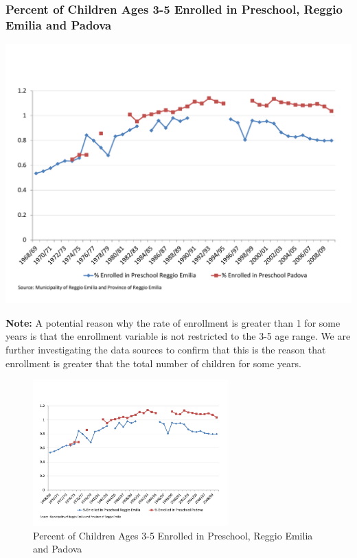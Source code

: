 \documentclass[static]{JJH-Beamer_PAGENOS}
\begin{document}
\begin{frame}
\frametitle{Percent of Children Ages 3-5 Enrolled in Preschool, Reggio Emilia and Padova}

\begin{center}
\includegraphics[scale=0.33]{../../output/image/Enrollement_Preschool_age3-5.pdf}
\end{center}
\tiny{\textbf{Note:} A potential reason why the rate of enrollment is greater than 1 for some years is that the enrollment variable is not restricted to the 3-5 age range. We are further investigating the data sources to confirm that this is the reason that enrollment is greater that the total number of children for some years.}
 
\centering
\begin{figure}[H]
\caption{Percent of Children Ages 3-5 Enrolled in Preschool, Reggio Emilia and Padova}
\includegraphics[width=0.67\textwidth]{../../output/image/Enrollement_Preschool_age3-5.pdf}
\end{figure}

\end{frame}
\end{document}
